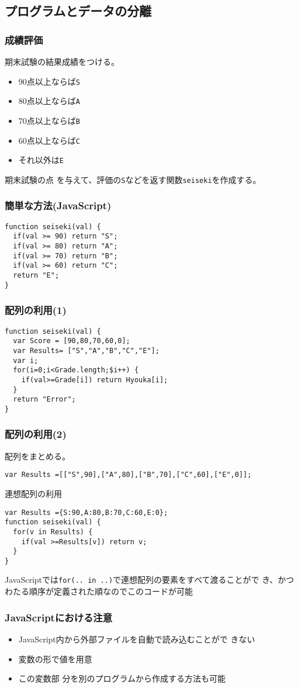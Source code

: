\subsection{プログラムとデータの分離}
 \begin{frame}[containsverbatim]
  \frametitle{成績評価}
  期末試験の結果成績をつける。
  \begin{itemize}
   \item 90点以上ならば\texttt{S}
   \item 80点以上ならば\texttt{A}
   \item 70点以上ならば\texttt{B}
   \item 60点以上ならば\texttt{C}
   \item それ以外は\texttt{E}
  \end{itemize}
 期末試験の点
 を与えて、評価の\texttt{S}などを返す関数\texttt{seiseki}を作成する。
\end{frame}
 \begin{frame}[containsverbatim]
  \frametitle{簡単な方法(JavaScript)}
\begin{Verbatim}
function seiseki(val) {
  if(val >= 90) return "S";
  if(val >= 80) return "A";
  if(val >= 70) return "B";
  if(val >= 60) return "C";
  return "E";
}
\end{Verbatim}
\end{frame}
\begin{frame}[containsverbatim] 
\frametitle{配列の利用(1)}
\begin{Verbatim}
function seiseki(val) {
  var Score = [90,80,70,60,0];
  var Results= ["S","A","B","C","E"];
  var i;
  for(i=0;i<Grade.length;$i++) {
    if(val>=Grade[i]) return Hyouka[i];
  }
  return "Error";
}
\end{Verbatim}
\end{frame}
\begin{frame}[containsverbatim]
 \frametitle{配列の利用(2)}
 配列をまとめる。
\begin{Verbatim}
var Results =[["S",90],["A",80],["B",70],["C",60],["E",0]];
\end{Verbatim}
 連想配列の利用
\begin{Verbatim}
var Results ={S:90,A:80,B:70,C:60,E:0};
function seiseki(val) {
  for(v in Results) {
    if(val >=Results[v]) return v;
  }
}
\end{Verbatim}
JavaScriptでは\texttt{for(.. in ..)}で連想配列の要素をすべて渡ることがで
き、かつわたる順序が定義された順なのでこのコードが可能
\end{frame}
\begin{frame}[containsverbatim]
 \frametitle{JavaScriptにおける注意}
\begin{itemize}
 \item JavaScript内から外部ファイルを自動で読み込むことがで
きない
 \item 変数の形で値を用意
 \item この変数部
分を別のプログラムから作成する方法も可能
\end{itemize}
\end{frame}

